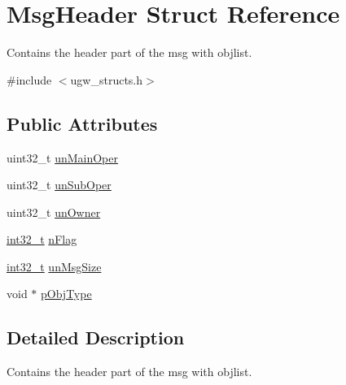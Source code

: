 \hypertarget{structMsgHeader}{\section{Msg\-Header Struct Reference}
\label{structMsgHeader}
}


Contains the header part of the msg with objlist.  




{\ttfamily \#include $<$ugw\-\_\-structs.\-h$>$}

\subsection*{Public Attributes}
\begin{DoxyCompactItemize}
\item 
uint32\-\_\-t \hyperlink{structMsgHeader_a669c6f42a4b2f1b5ceb28e5e8ecb689d}{un\-Main\-Oper}
\item 
uint32\-\_\-t \hyperlink{structMsgHeader_a23764d626c84a4f847c356e9a0c154ed}{un\-Sub\-Oper}
\item 
uint32\-\_\-t \hyperlink{structMsgHeader_a10f7c7b6792d6280e8efca09dd9bdcbf}{un\-Owner}
\item 
\hyperlink{commondefs_8h_a32f2e37ee053cf2ce8ca28d1f74630e5}{int32\-\_\-t} \hyperlink{structMsgHeader_a6b8c97c2b81c02938508b180a4af8360}{n\-Flag}
\item 
\hyperlink{commondefs_8h_a32f2e37ee053cf2ce8ca28d1f74630e5}{int32\-\_\-t} \hyperlink{structMsgHeader_a9012032bb9a4daaa98536c941394da2c}{un\-Msg\-Size}
\item 
void $\ast$ \hyperlink{structMsgHeader_a72b10e80b8417cde7c83d543b0cfed71}{p\-Obj\-Type}
\end{DoxyCompactItemize}


\subsection{Detailed Description}
Contains the header part of the msg with objlist. 

